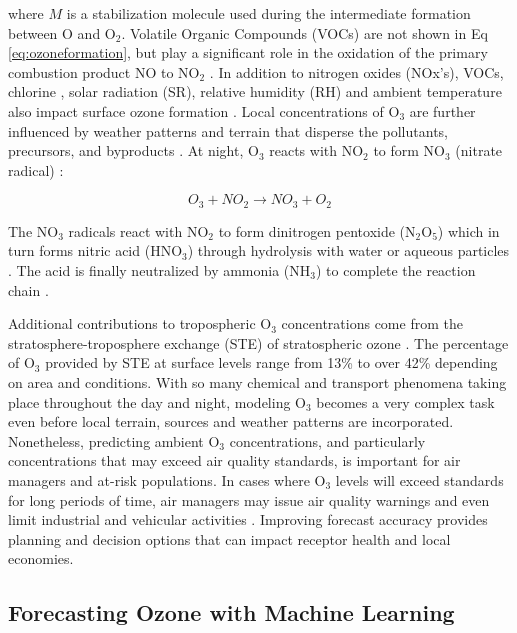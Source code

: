 \documentclass[preprint,12pt,a4paper,authoryear]{elsarticle}
\begin{document}
\begin{linenumbers}
\noindent
where $M$ is a stabilization molecule used during the intermediate formation between O and O$_{2}$. Volatile Organic Compounds (VOCs) are not shown in Eq \ref{eq:ozoneformation}, but play a significant role in the oxidation of the primary combustion product NO to NO$_{2}$ \citep{Song2011}. In addition to nitrogen oxides (NOx's), VOCs, chlorine \citep{Thornton2010}, solar radiation (SR), relative humidity (RH) and ambient temperature also impact surface ozone formation \citep{Sadanaga2003}.  Local concentrations of O$_{3}$ are further influenced by weather patterns and terrain that disperse the pollutants, precursors, and byproducts \citep{Beck1998}. At night, O$_{3}$ reacts with NO$_{2}$ to form NO$_{3}$ (nitrate radical) \citep{Finlayson1993}:

\begin{equation}
\label{eq:nitrateformation}
O_{3} + NO_{2}\rightarrow NO_{3}+O_{2} 
\end{equation}

The NO$_{3}$ radicals react with NO$_{2}$ to form dinitrogen pentoxide (N$_{2}$O$_{5}$) which in turn forms nitric acid (HNO$_{3}$) through hydrolysis with water or aqueous particles \citep{Song2011}. The acid is finally neutralized by ammonia (NH$_{3}$) to complete the reaction chain \citep{Brown2012}.

Additional contributions to tropospheric O$_{3}$ concentrations come from the stratosphere-troposphere exchange (STE) of stratospheric ozone \citep{Tarasick2008}. The percentage of O$_{3}$ provided by STE at surface levels range from 13\% \citep{Cooper2006} to over 42\% \citep{Lelieveld2000} depending on area and conditions. With so many chemical and transport phenomena taking place throughout the day and night, modeling O$_{3}$ becomes a very complex task even before local terrain, sources and weather patterns are incorporated. Nonetheless, predicting ambient O$_{3}$ concentrations, and particularly concentrations that may exceed air quality standards, is important for air managers and at-risk populations.  In cases where O$_{3}$ levels will exceed standards for long periods of time, air managers may issue air quality warnings and even limit industrial and vehicular activities \citep{Kuhlbusch2014, Welch2005}. Improving forecast accuracy provides planning and decision options that can impact receptor health and local economies.

\subsection{Forecasting Ozone with Machine Learning}


\end{linenumbers}
\end{document}

